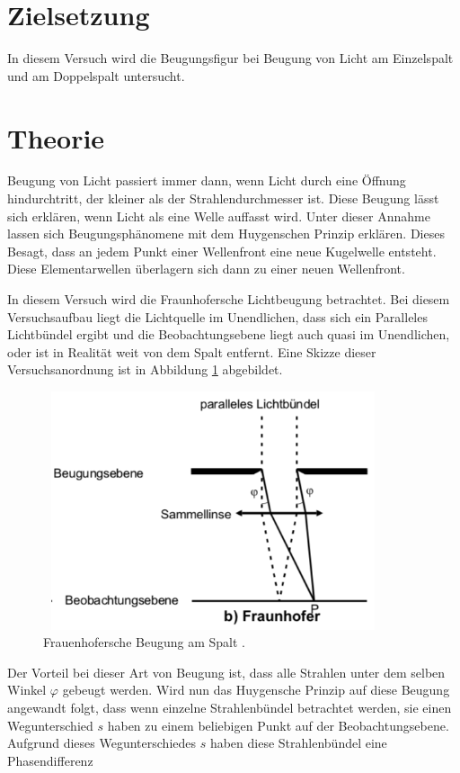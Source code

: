 \section{Zielsetzung}

In diesem Versuch wird die Beugungsfigur bei Beugung von Licht am Einzelspalt und
am Doppelspalt untersucht.

\section{Theorie}

Beugung von Licht passiert immer dann, wenn Licht durch eine Öffnung hindurchtritt,
der kleiner als der Strahlendurchmesser ist. Diese Beugung lässt sich erklären, wenn
Licht als eine Welle auffasst wird. Unter dieser Annahme lassen sich Beugungsphänomene
mit dem Huygenschen Prinzip erklären. Dieses Besagt, dass an jedem Punkt
einer Wellenfront eine neue Kugelwelle entsteht. Diese Elementarwellen überlagern
sich dann zu einer neuen Wellenfront.

In diesem Versuch wird die Fraunhofersche Lichtbeugung betrachtet. Bei diesem Versuchsaufbau
liegt die Lichtquelle im Unendlichen, dass sich ein Paralleles Lichtbündel ergibt und
die Beobachtungsebene liegt auch quasi im Unendlichen, oder ist in Realität weit von
dem Spalt entfernt. Eine Skizze dieser Versuchsanordnung ist in Abbildung \ref{abb:1}
abgebildet.

\begin{figure}[H]
  \centering
  \includegraphics[width=10cm, height=7cm]{content/Frauenhofer.png}
  \caption{Frauenhofersche Beugung am Spalt \cite{1}.}
  \label{abb:1}
\end{figure}

Der Vorteil bei dieser Art von Beugung ist, dass alle Strahlen unter dem selben Winkel
$\varphi$ gebeugt werden. Wird nun das Huygensche Prinzip auf diese Beugung angewandt
folgt, dass wenn einzelne Strahlenbündel betrachtet werden, sie einen Wegunterschied $s$
haben zu einem beliebigen Punkt auf der Beobachtungsebene. Aufgrund dieses Wegunterschiedes $s$
haben diese Strahlenbündel eine Phasendifferenz

